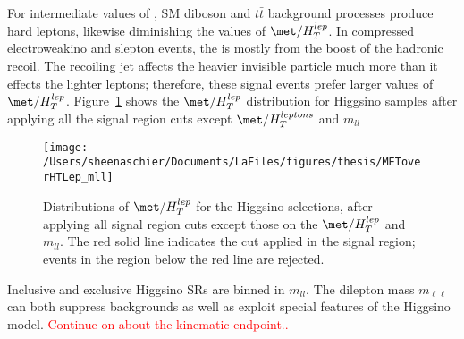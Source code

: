  For intermediate values of \met, SM diboson and $t\bar{t}$ background processes produce hard leptons, likewise diminishing the values of $\met/H_T^{lep}$.  In compressed electroweakino and slepton events, the \met{} is mostly from the boost of the hadronic recoil.  The recoiling jet affects the heavier invisible particle much more than it effects the lighter leptons; therefore, these signal events prefer larger values of $\met/H_T^{lep}$.  Figure~\ref{fig:METoverHTmll} shows the $\met/H_{T}^{lep}$ distribution for Higgsino samples after applying all the signal region cuts except $\met/H_{T}^{leptons}$ and $m_{ll}$
 \begin{figure}[tbp]
  \centering
  \texttt{[image: /Users/sheenaschier/Documents/LaFiles/figures/thesis/METoverHTLep\_mll]}
 \caption{Distributions of $\met/H_{T}^{lep}$ for the Higgsino selections, after applying all signal region cuts except those on the $\met/H_{T}^{lep}$ and $m_{ll}$.  The red solid line indicates the cut applied in the signal region; events in the region below the red line are rejected.}
 \label{fig:METoverHTmll}
 \end{figure}

Inclusive and exclusive Higgsino SRs are binned in $m_{ll}$. The dilepton mass $m_{\ell\ell}$ can both suppress backgrounds as well as exploit special features of the Higgsino model.  \textcolor{red}{Continue on about the kinematic endpoint..}  
 \begin{table}[]
 \tiny
\centering
{}
\caption{Higgsino specific SR cuts.}
\end{table}
\FloatBarrier
 
